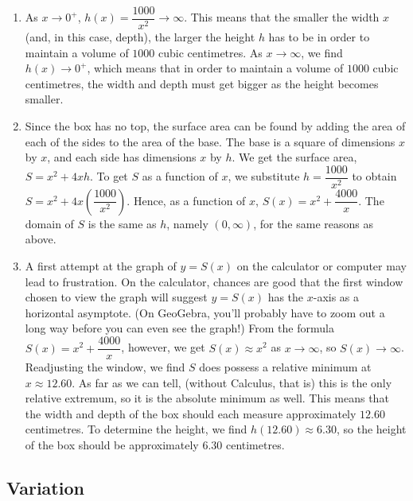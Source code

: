 {\begin{enumerate}
\drawexampleline

\item As $x \rightarrow 0^{+}$, $h(x) = \dfrac{1000}{x^2} \rightarrow \infty$.  This means that the smaller the width $x$  (and, in this case, depth), the larger the height $h$ has to be in order to maintain a volume of $1000$ cubic centimetres. As $x \rightarrow \infty$, we find $h(x) \rightarrow 0^{+}$, which means that in order to maintain a volume of $1000$ cubic centimetres, the width and depth must get bigger as the height becomes smaller.

\item  Since the box has no top, the surface area can be found by adding the area of each of the sides to the area of the base.  The base is a square of dimensions $x$ by $x$, and each side has dimensions $x$ by $h$.  We get the surface area, $S = x^2+4xh$.  To get $S$ as a function of $x$, we substitute $h = \dfrac{1000}{x^2}$ to obtain $S = x^2+4x \left( \dfrac{1000}{x^2}\right)$.  Hence, as a function of $x$, $S(x) = x^2 + \dfrac{4000}{x}$.  The domain of $S$ is the same as $h$, namely $(0, \infty)$, for the same reasons as above.

\item   A first attempt at the graph of $y=S(x)$ on the calculator or computer may lead to frustration.  On the calculator, chances are good that the first window chosen to view the graph will suggest $y=S(x)$ has the $x$-axis as a horizontal asymptote. (On GeoGebra, you'll probably have to zoom out a long way before you can even see the graph!)  From the formula $S(x) = x^2 + \dfrac{4000}{x}$, however, we get $S(x) \approx x^2$ as $x \rightarrow \infty$, so $S(x) \rightarrow \infty$.  Readjusting the window, we find $S$ does possess a relative minimum at $x \approx 12.60$.  As far as we can tell, (without Calculus, that is) this is the only relative extremum, so it is the absolute minimum as well. This means that the width and depth of the box should each measure approximately $12.60$ centimetres.  To determine the height, we find $h(12.60) \approx 6.30$, so the height of the box should be approximately $6.30$ centimetres.


\end{enumerate}
}

\medskip

\subsection{Variation}
\label{Variation}

